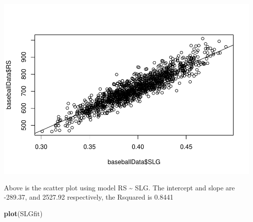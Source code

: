 \documentclass[
]{article}
\newenvironment{Shaded}{\begin{snugshade}}{\end{snugshade}}
\newcommand{\KeywordTok}[1]{\textcolor[rgb]{0.13,0.29,0.53}{\textbf{#1}}}
\newcommand{\NormalTok}[1]{#1}
\begin{document}
\includegraphics{HW2_Liu-Zi-Jian_files/figure-latex/unnamed-chunk-37-1.pdf}

Above is the scatter plot using model RS \textasciitilde{} SLG. The
intercept and slope are -289.37, and 2527.92 respectively, the Rsquared
is 0.8441

\begin{Shaded}
\begin{Highlighting}[]
\KeywordTok{plot}\NormalTok{(SLGfit)}
\end{Highlighting}
\end{Shaded}
\end{document}
